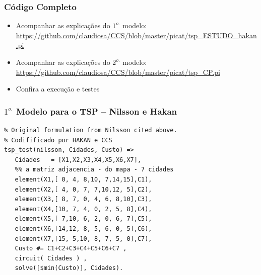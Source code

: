\begin{frame}[fragile]
\frametitle{Código Completo}

\begin{itemize}
\item Acompanhar as explicações do $1^{o.}$ modelo:\\
\url{https://github.com/claudiosa/CCS/blob/master/picat/tsp_ESTUDO_hakan.pi}


\item Acompanhar as explicações do $2^{o.}$ modelo:\\
\url{https://github.com/claudiosa/CCS/blob/master/picat/tsp_CP.pi}

\item Confira a execução e testes
\end{itemize}

\end{frame}

\begin{frame}[fragile]
\frametitle{$1^{o.}$ Modelo para o TSP -- Nilsson e Hakan}

\begin{footnotesize}
\begin{verbatim}
% Original formulation from Nilsson cited above.
% Codifificado por HAKAN e CCS
tsp_test(nilsson, Cidades, Custo) =>
   Cidades   = [X1,X2,X3,X4,X5,X6,X7],
   %% a matriz adjacencia - do mapa - 7 cidades
   element(X1,[ 0, 4, 8,10, 7,14,15],C1),
   element(X2,[ 4, 0, 7, 7,10,12, 5],C2),
   element(X3,[ 8, 7, 0, 4, 6, 8,10],C3),
   element(X4,[10, 7, 4, 0, 2, 5, 8],C4),
   element(X5,[ 7,10, 6, 2, 0, 6, 7],C5),
   element(X6,[14,12, 8, 5, 6, 0, 5],C6),
   element(X7,[15, 5,10, 8, 7, 5, 0],C7),
   Custo #= C1+C2+C3+C4+C5+C6+C7 ,
   circuit( Cidades ) ,
   solve([$min(Custo)], Cidades).
\end{verbatim}
\end{footnotesize}

\end{frame}

